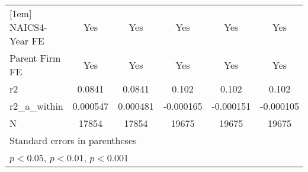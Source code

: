 {\begin{tabular}{l*{5}{c}}
[1em]
NAICS4-Year FE&         Yes         &         Yes         &         Yes         &         Yes         &         Yes         \\
[1em]
Parent Firm FE&         Yes         &         Yes         &         Yes         &         Yes         &         Yes         \\
\hline
r2          &      0.0841         &      0.0841         &       0.102         &       0.102         &       0.102         \\
r2\_a\_within &    0.000547         &    0.000481         &   -0.000165         &   -0.000151         &   -0.000105         \\
N           &       17854         &       17854         &       19675         &       19675         &       19675         \\
\hline\hline
\multicolumn{6}{l}{\footnotesize Standard errors in parentheses}\\
\multicolumn{6}{l}{\footnotesize \sym{*} \(p<0.05\), \sym{**} \(p<0.01\), \sym{***} \(p<0.001\)}\\
\end{tabular}
}
